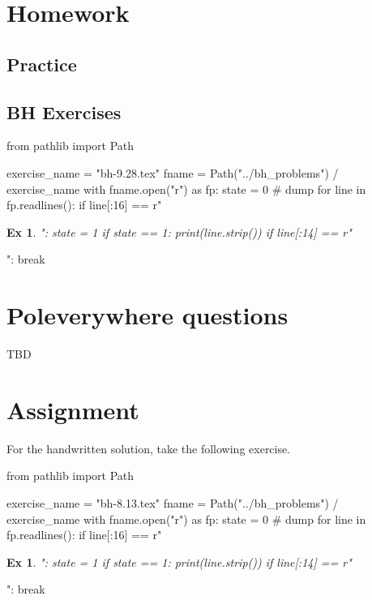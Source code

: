 \documentclass[a4paper,11pt]{article}
\newtheorem{exercise}[theorem]{Ex}
\begin{document}
\section{Homework}

\label{sec:homework}

\subsection{Practice}
\label{sec:practice}



\subsection{BH Exercises}
\label{sec:bh-exercises-1}

\begin{pycode}
from pathlib import Path

exercise_name = "bh-9.28.tex"
fname = Path("../bh_problems") / exercise_name
with fname.open("r") as fp:
    state = 0  # dump
    for line in fp.readlines():
        if line[:16] == r"\begin{exercise}":
            state = 1
        if state == 1:
            print(line.strip())
        if line[:14] == r"\end{exercise}":
            break
\end{pycode}



\section{Poleverywhere questions}
\label{sec:polev-quest}


TBD


\section{Assignment}
\label{sec:assignment}

For the handwritten solution, take the following exercise.

\begin{pycode}
from pathlib import Path

exercise_name = "bh-8.13.tex"
fname = Path("../bh_problems") / exercise_name
with fname.open("r") as fp:
    state = 0  # dump
    for line in fp.readlines():
        if line[:16] == r"\begin{exercise}":
            state = 1
        if state == 1:
            print(line.strip())
        if line[:14] == r"\end{exercise}":
            break
\end{pycode}






\end{document}
